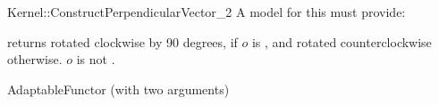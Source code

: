 \begin{ccRefFunctionObjectConcept}{Kernel::ConstructPerpendicularVector_2}
A model for this must provide:


{returns  rotated clockwise by 90 degrees, if $o$ is
, and rotated counterclockwise otherwise.
\ccPrecond $o$ is not .
}

\ccRefines
AdaptableFunctor (with two arguments)

\ccSeeAlso
{} \\

\end{ccRefFunctionObjectConcept}
